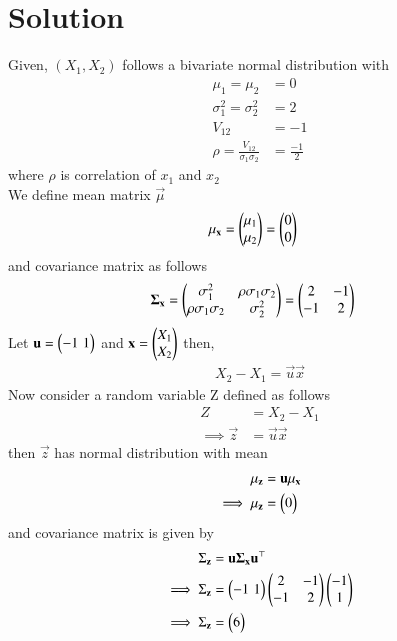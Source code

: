 \documentclass[journal,12pt,twocolumn]{IEEEtran}
\begin{document}
\section*{Solution}
Given, $(X_1,X_2)$ follows a bivariate normal distribution with
\begin{align}
    \mu_1=\mu_2&=0\\
    \sigma^2_1=\sigma^2_2&=2\\
    V_{12}&=-1\\
    \rho=\frac{V_{12}}{\sigma_1\sigma_2}&=\frac{-1}{2}
\end{align}
where $\rho$ is correlation of $x_1$ and $x_2$\\
We define mean matrix $\vec{\mu}$
\begin{align}
    \mathbf{\mu_{\mathbf{x}}}&=\begin{pmatrix}\mu_1\\
             \mu_2\end{pmatrix}
             =\begin{pmatrix}0\\
             0\end{pmatrix}
             \label{a}
\end{align}
 and covariance matrix \vec{$\Sigma$} as follows
\begin{align}
    \mathbf{\Sigma_{\mathbf{x}}}&=\begin{pmatrix}\sigma_1^2&\rho\sigma_1\sigma_2\\
                    \rho\sigma_1\sigma_2&\sigma_2^2\end{pmatrix}
                = \begin{pmatrix}2&-1\\
                        -1&2\end{pmatrix}
                \label{b}
\end{align}
Let $\mathbf{u}=\begin{pmatrix}-1\,\,1\end{pmatrix}$ and $\mathbf{x}=\begin{pmatrix}X_1\\
                    X_2\end{pmatrix}$ then,
\begin{align}
    X_2-X_1=\vec{u}\vec{x}
\end{align}
Now consider a random variable Z defined as follows
\begin{align}
    Z&=X_2-X_1\\
    \implies \vec{z}&=\vec{u}\vec{x}
\end{align}
then $\vec{z}$ has normal distribution with mean
\begin{align}
    \mu_{\mathbf{z}}&=\mathbf{u}\mathbf{\mu_{\mathbf{x}}}\\
    \implies \mu_{\mathbf{z}}&=\begin{pmatrix}0\end{pmatrix}
\end{align}
and covariance matrix is given by
\begin{align}
    \Sigma_{\mathbf{z}}&=\mathbf{u}\mathbf{\Sigma_{\mathbf{x}}}\mathbf{u}^{\top}\\
    \implies \Sigma_{\mathbf{z}}&=\begin{pmatrix}-1\,\,1\end{pmatrix}\begin{pmatrix}2&-1\\
                                                     -1&2\end{pmatrix}\begin{pmatrix}-1\\
                                                                  1\end{pmatrix}\\
    \implies \Sigma_{\mathbf{z}}&=\begin{pmatrix}6\end{pmatrix}                
\end{align}
\end{document}
